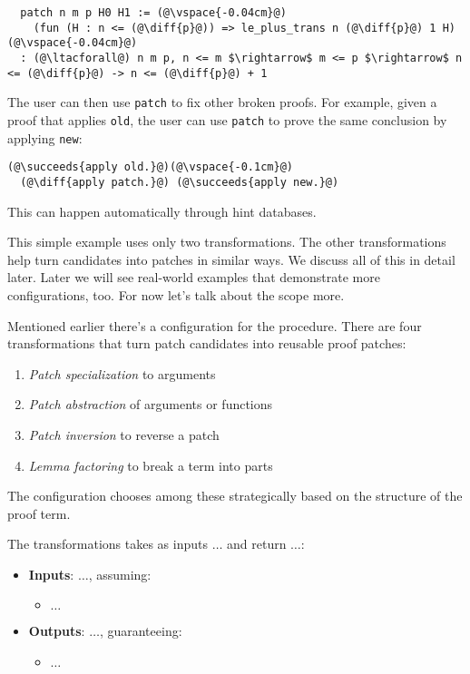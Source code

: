 \begin{lstlisting}
  patch n m p H0 H1 := (@\vspace{-0.04cm}@)
    (fun (H : n <= (@\diff{p}@)) => le_plus_trans n (@\diff{p}@) 1 H)(@\vspace{-0.04cm}@)
  : (@\ltacforall@) n m p, n <= m $\rightarrow$ m <= p $\rightarrow$ n <= (@\diff{p}@) -> n <= (@\diff{p}@) + 1
\end{lstlisting}
The user can then use \lstinline{patch} to fix other broken proofs.
For example, given a proof that applies \lstinline{old}, the user can use \lstinline{patch} to prove the same conclusion
by applying \lstinline{new}:

\begin{lstlisting}[language=coq]
  (@\succeeds{apply old.}@)(@\vspace{-0.1cm}@)
  (@\diff{apply patch.}@) (@\succeeds{apply new.}@)
\end{lstlisting}
This can happen automatically through hint databases.

This simple example uses only two transformations. The other transformations help turn candidates
into patches in similar ways. We discuss all of this in detail later.
Later we will see real-world examples that demonstrate more configurations, too.
For now let's talk about the scope more.

Mentioned earlier there's a configuration for the procedure.
There are four transformations that turn patch candidates into reusable proof patches:

\begin{enumerate}
\item \textit{Patch specialization} to arguments
\item \textit{Patch abstraction} of arguments or functions
\item \textit{Patch inversion} to reverse a patch
\item \textit{Lemma factoring} to break a term into parts
\end{enumerate}
The configuration chooses among these strategically based on the structure of the proof term.

The transformations takes as inputs $\ldots$ and return $\ldots$:

\begin{itemize}
\item \textbf{Inputs}: $\ldots$, assuming:
\begin{itemize}
\item $\ldots$
\end{itemize}
\item \textbf{Outputs}: $\ldots$, guaranteeing:
\begin{itemize}
\item $\ldots$
\end{itemize}
\end{itemize}

